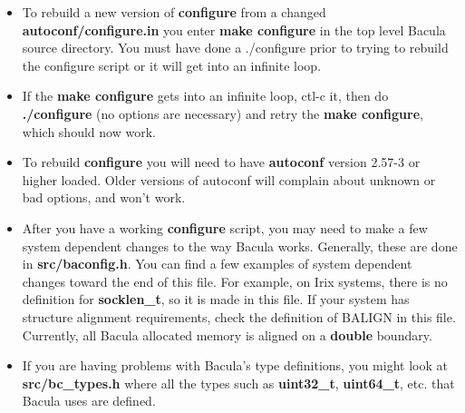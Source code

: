 \begin{itemize}
\item To rebuild a new version of {\bf configure} from a changed {\bf
   autoconf/configure.in}  you enter {\bf make configure} in the top level Bacula
   source  directory. You must have done a ./configure prior to trying to rebuild
 the configure script or it will get into an infinite loop.
\item If the {\bf make configure} gets into an infinite loop, ctl-c it, then
   do  {\bf ./configure} (no options are necessary) and retry the  {\bf make
   configure}, which should now work.
\item To rebuild {\bf configure} you will need to have {\bf autoconf} version
   2.57-3 or higher loaded. Older versions of autoconf will complain about
   unknown or bad options, and won't work.
\item After you have a working {\bf configure} script, you may need to  make a
   few system dependent changes to the way Bacula works.  Generally, these are
   done in {\bf src/baconfig.h}. You can find  a few examples of system dependent
changes toward the end of this  file. For example, on Irix systems, there is
no definition for  {\bf socklen\_t}, so it is made in this file. If your
system has  structure alignment requirements, check the definition of BALIGN
in  this file. Currently, all Bacula allocated memory is aligned on a {\bf
double}  boundary.
\item If you are having problems with Bacula's type definitions, you might
   look at {\bf src/bc\_types.h} where all the types such as {\bf uint32\_t},
   {\bf uint64\_t}, etc. that Bacula uses are defined.
\end{itemize}
